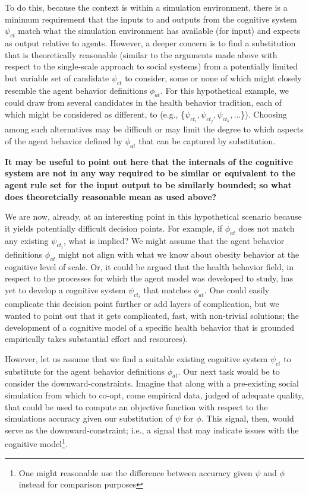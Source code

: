 \documentclass{article}
\begin{document}
To do this, because the context is within a simulation environment, there is a minimum requirement that the inputs to and outputs from the cognitive system $\psi_{ct}$ match what the simulation environment has available (for input) and expects as output relative to agents.  However, a deeper concern is to find a substitution that is theoretically reasonable (similar to the arguments made above with respect to the single-scale approach to social systems) from a potentially limited but variable set of candidate $\psi_{ct}$ to consider, some or none of which might closely resemble the agent behavior definitions $\phi_{at}$. For this hypothetical example, we could draw from several candidates in the health behavior tradition, each of which might be considered as different, to  (e.g., \{$\psi_{ct_i}, \psi_{ct_j}, \psi_{ct_k},...$\}).  Choosing among such alternatives may be difficult or may limit the degree to which aspects of the agent behavior defined by $\phi_{at}$ that can be captured by substitution.

  
\textbf{It may be useful to point out here that the internals of the cognitive system are not in any way required to be similar or equivalent to the agent rule set for the input output to be similarly bounded; so what does theoretcially reasonable mean as used above?}


We are now, already, at an interesting point in this hypothetical scenario because it yields potentially difficult decision points.  For example,  if $\phi_{at}$ does not match any existing $\psi_{ct_i}$, what is implied?  We might assume that the agent behavior definitions $\phi_{at}$ might not align with what we know about obesity behavior at the cognitive level of scale.  Or, it could be argued that the health behavior field, in respect to the processes for which the agent model was developed to study, has yet to develop a cognitive system $\psi_{ct_i}$ that matches $\phi_{at}$.  One could easily complicate this decision point further or add layers of complication, but we wanted to point out that it gets complicated, fast, with non-trivial solutions; the development of a cognitive model of a specific health behavior that is grounded empirically takes substantial effort and resources).  

However, let us assume that we find a suitable existing cognitive system $\psi_{ct}$ to substitute for the agent behavior definitions $\phi_{at}$. Our next task would be to consider the downward-constraints.  Imagine that along with a pre-existing social simulation from which to co-opt, come empirical data, judged of adequate quality, that could be used to compute an objective function with respect to the simulations accuracy given our substitution of $\psi$ for $\phi$. This signal, then, would serve as the downward-constraint; i.e., a signal that may indicate issues with the cognitive model\footnote{One might reasonable use the difference between accuracy given $\psi$ and $\phi$ instead for comparison purposes}.  
\end{document}
